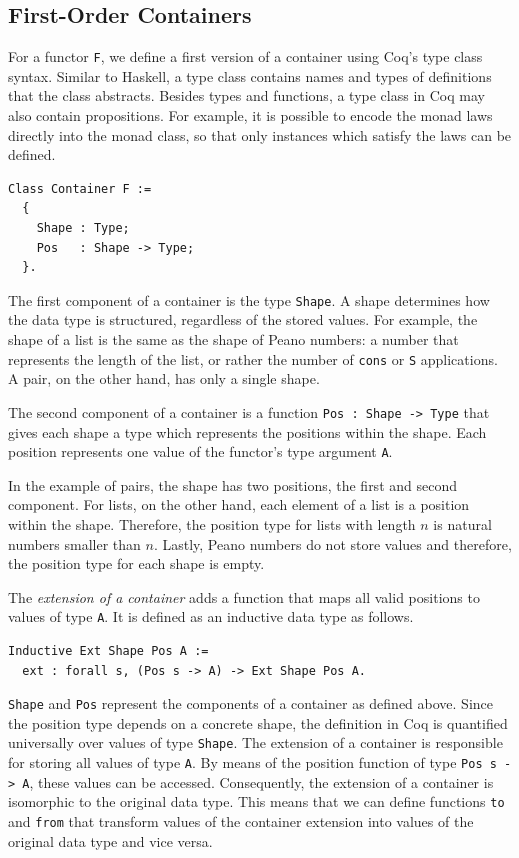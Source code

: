 \documentclass[a4paper, 11pt, fleqn, twoside, abstract=on]{scrreprt}
\newcommand{\hinl}[1]{\texttt{#1}}
\newcommand{\cinl}[1]{\texttt{#1}}
\begin{document}
\subsection{First-Order Containers}
For a functor \cinl{F}, we define a first version of a container using Coq's type class syntax.
Similar to Haskell, a type class contains names and types of definitions that the class abstracts.
Besides types and functions, a type class in Coq may also contain propositions.
For example, it is possible to encode the monad laws directly into the monad class, so that only instances which satisfy the laws can be defined.

\begin{verbatim}
Class Container F :=
  {
    Shape : Type;
    Pos   : Shape -> Type;
  }.
\end{verbatim}
\noindent
The first component of a container is the type \texttt{Shape}.
A shape determines how the data type is structured, regardless of the stored values.
For example, the  shape of a list is the same as the shape of Peano numbers: a number that  represents the length of the list, or rather the number of \cinl{cons} or \cinl{S} applications.
A pair, on the other hand, has only a single shape.

The second component of a container is a function \cinl{Pos : Shape -> Type} that gives each shape a type which represents the positions within the shape.
Each position represents one value of the functor's type argument \hinl{A}.

In the example of pairs, the shape has two positions, the first and second component.
For lists, on the other hand, each element of a list is a position within the shape.
Therefore, the position type for lists with length $n$ is natural numbers smaller than $n$.
Lastly, Peano numbers do not store values and therefore, the position type for each shape is empty.

The \textit{extension of a container} adds a function that maps all valid positions to values of type \cinl{A}.
It is defined as an inductive data type as follows.

\begin{verbatim}
Inductive Ext Shape Pos A := 
  ext : forall s, (Pos s -> A) -> Ext Shape Pos A.
\end{verbatim}
\noindent
\cinl{Shape} and \cinl{Pos} represent the components of a container as defined above.
Since the position type depends on a concrete shape, the definition in Coq is quantified universally over values of type \cinl{Shape}.
The extension of a container is responsible for storing all values of type \cinl{A}.
By means of the position function of type \cinl{Pos s -> A}, these values can be accessed.
Consequently, the extension of a container is isomorphic to the original data type.
This means that we can define functions \cinl{to} and \cinl{from} that transform values of the container extension into values of the original data type and vice versa.
\end{document}
